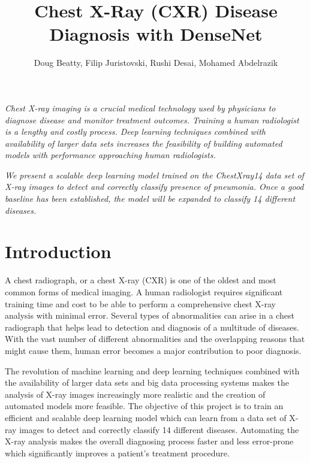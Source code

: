 \documentclass{amia}
\begin{document}
\title{Chest X-Ray (CXR) Disease Diagnosis with DenseNet}

\author{Doug Beatty, Filip Juristovski, Rushi Desai, Mohamed Abdelrazik}


\maketitle


\textit{Chest X-ray imaging \cite{ref1} is a crucial medical technology used by physicians to diagnose disease and monitor treatment outcomes. Training a human radiologist is a lengthy and costly process. Deep learning techniques combined with availability of larger data sets increases the feasibility of building automated models with performance approaching human radiologists.}

\textit{We present a scalable deep learning model trained on the ChestXray14 \cite{ref7} data set of X-ray images to detect and correctly classify presence of pneumonia. Once a good baseline has been established, the model will be expanded to classify 14 different diseases.}

\section*{Introduction}
A chest radiograph\cite{ref1}, or a chest X-ray (CXR) is one of the oldest and most common forms of medical imaging. A human radiologist requires significant training time and cost to be able to perform a comprehensive chest X-ray analysis with minimal error. Several types of abnormalities can arise in a chest radiograph that helps lead to detection and diagnosis of a multitude of diseases. With the vast number of different abnormalities and the overlapping reasons that might cause them, human error becomes a major contribution to poor diagnosis.

The revolution of machine learning and deep learning techniques combined with the availability of larger data sets\cite{ref2} and big data processing systems\cite{ref3} makes the analysis of X-ray images increasingly more realistic and the creation of automated models more feasible. The objective of this project is to train an efficient and scalable deep learning model which can learn from a data set of X-ray images to detect and correctly classify 14 different diseases. Automating the X-ray analysis makes the overall diagnosing process faster and less error-prone which significantly improves a patient’s treatment procedure.
\end{document}
